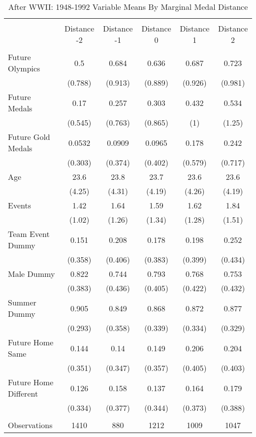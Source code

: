 
\begin{table}[!htbp] \centering 
  \renewcommand\thetable{A2}
  \caption{After WWII: 1948-1992 Variable Means By Marginal Medal Distance} 
  \label{} 
\small 
\begin{tabular}{@{\extracolsep{5pt}} lccccc} 
\\[-1.8ex]\hline \\[-1.8ex] 
 & Distance -2 & Distance -1 & Distance 0 & Distance 1 & Distance 2 \\ 
\hline 
\hline \\[-1.8ex] 
Future Olympics & 0.5 & 0.684 & 0.636 & 0.687 & 0.723 \\ 
 & (0.788) & (0.913) & (0.889) & (0.926) & (0.981) \\ 
Future Medals & 0.17 & 0.257 & 0.303 & 0.432 & 0.534 \\ 
  & (0.545) & (0.763) & (0.865) & (1) & (1.25) \\ 
Future Gold Medals & 0.0532 & 0.0909 & 0.0965 & 0.178 & 0.242 \\ 
   & (0.303) & (0.374) & (0.402) & (0.579) & (0.717) \\ 
Age & 23.6 & 23.8 & 23.7 & 23.6 & 23.6 \\ 
    & (4.25) & (4.31) & (4.19) & (4.26) & (4.19) \\ 
Events & 1.42 & 1.64 & 1.59 & 1.62 & 1.84 \\ 
     & (1.02) & (1.26) & (1.34) & (1.28) & (1.51) \\ 
Team Event Dummy & 0.151 & 0.208 & 0.178 & 0.198 & 0.252 \\ 
      & (0.358) & (0.406) & (0.383) & (0.399) & (0.434) \\ 
Male Dummy & 0.822 & 0.744 & 0.793 & 0.768 & 0.753 \\ 
       & (0.383) & (0.436) & (0.405) & (0.422) & (0.432) \\ 
Summer Dummy & 0.905 & 0.849 & 0.868 & 0.872 & 0.877 \\ 
        & (0.293) & (0.358) & (0.339) & (0.334) & (0.329) \\ 
Future Home Same & 0.144 & 0.14 & 0.149 & 0.206 & 0.204 \\ 
         & (0.351) & (0.347) & (0.357) & (0.405) & (0.403) \\ 
Future Home Different & 0.126 & 0.158 & 0.137 & 0.164 & 0.179 \\ 
          & (0.334) & (0.377) & (0.344) & (0.373) & (0.388) \\ 
           &  &  &  &  &  \\ 
Observations & 1410 & 880 & 1212 & 1009 & 1047 \\ 

\end{tabular}
\end{table}
